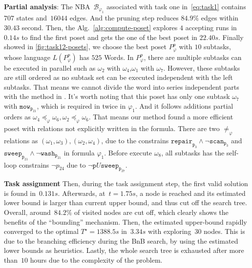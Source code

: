\textbf{Partial analysis}:
The NBA~$\mathcal{B}_{\varphi_1}$ associated with task one in~\eqref{eq:task1}
contains~$707$ states and~$16044$ edges. And the pruning step reduces $84.9\%$ edges within
$30.43$ second. Then, the Alg.~\ref{alg:compute-poset} explores
 $4$ accepting runs in $0.14s$ to find the first poset and gets the one of the best poset in $22.40s$.
 Finally showed in \ref{fig:task12-posets}, we choose the best poset $P^{p}_{\varphi}$ with $10$ subtasks, whose language
 $L(P^{p}_{\varphi})$ has $525$ {Words}. In $P^{p}_{\varphi}$, there are
 multiple subtasks can be executed in parallel such as $\omega_2 $ with $ \omega_4$,$\omega_1 $ with $ \omega_7$.
 However, these subtasks are still ordered as no subtask set can be executed independent with the left
 subtasks. That means we cannot
 divide the word into series independent parts with the method in \citep{schillinger2018simultaneous}.
 It's worth noting that this poset has only one subtask $\omega_7$ with $\texttt{mow}_{\texttt{p}_{21}}$,
 which is required in twice in $\varphi_1$. And it follows additions partial orders as
 $\omega_4\preceq_\varphi \omega_6,\omega_2\preceq_\varphi \omega_6$. That means our method found
 a more efficient poset with relations not explicitly written in the formula.
 There are two $\neq_\varphi$ relations as $(\omega_1,\omega_3),(\omega_2,\omega_4)$, due to the constrains
 $\texttt{repair}_{\texttt{p}_3}\wedge\lnot\texttt{scan}_{\texttt{p}_3} $ and
  $\texttt{sweep}_{\texttt{p}_{21}} \wedge \lnot \texttt{wash}_{\texttt{p}_{21}}$ in formula $\varphi_1$.
  Before execute $\omega_8$, all subtasks has the self-loop constrains $\lnot p_{24}$ due to
   $\lnot \texttt{p} U \texttt{sweep}_{\texttt{p}_{27}}$.



\textbf{Task assignment}
Then, during the task assignment step,
the first valid solution is found in~$0.131s$.
Afterwards, at~$t=1.75s$, a node is reached and its estimated lower
bound is larger than current upper bound, and thus cut off the search tree.
Overall, around~$84.2\%$ of visited nodes are cut off,
which clearly shows the benefits of the ``bounding'' mechanism.
Then, the estimated upper-bound rapidly converged
to the optimal $T^\star=1388.5s$ in~$3.34s$ with exploring~$30$ nodes.
This is due to the branching efficiency during the BnB search,
by using the estimated lower bounds as heuristics.
Lastly, the whole search tree is exhausted after more than~$10$ hours
due to the complexity of the problem.


